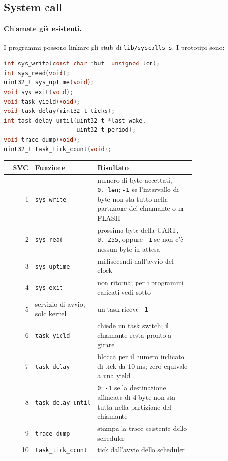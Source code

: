 \subsection{System call}

\begin{sloppypar}
\paragraph{Chiamate già esistenti.} I programmi possono linkare gli stub di \texttt{lib/syscalls.s}. I prototipi sono:
\end{sloppypar}
\begin{lstlisting}[language=C]
int sys_write(const char *buf, unsigned len);
int sys_read(void);
uint32_t sys_uptime(void);
void sys_exit(void);
void task_yield(void);
void task_delay(uint32_t ticks);
int task_delay_until(uint32_t *last_wake,
                     uint32_t period);
void trace_dump(void);
uint32_t task_tick_count(void);
\end{lstlisting}

\begin{center}
\small
\begin{tabular}{|r|p{0.25\linewidth}|p{0.52\linewidth}|}
\hline
SVC & \raggedright Funzione & \raggedright Risultato \tabularnewline
\hline\hline
1 & \raggedright \texttt{sys\_write} & \raggedright numero di byte accettati, \texttt{0..len}; \texttt{-1} se l'intervallo di byte non sta tutto nella partizione del chiamante o in FLASH \tabularnewline
\hline
2 & \raggedright \texttt{sys\_read} & \raggedright prossimo byte della UART, \texttt{0..255}, oppure \texttt{-1} se non c'è nessun byte in attesa \tabularnewline
\hline
3 & \raggedright \texttt{sys\_uptime} & \raggedright millisecondi dall'avvio del clock \tabularnewline
\hline
4 & \raggedright \texttt{sys\_exit} & \raggedright non ritorna; per i programmi caricati vedi sotto \tabularnewline
\hline
5 & \raggedright servizio di avvio, solo kernel & \raggedright un task riceve \texttt{-1} \tabularnewline
\hline
6 & \raggedright \texttt{task\_yield} & \raggedright chiede un task switch; il chiamante resta pronto a girare \tabularnewline
\hline
7 & \raggedright \texttt{task\_delay} & \raggedright blocca per il numero indicato di tick da 10 ms; zero equivale a una yield \tabularnewline
\hline
8 & \raggedright \texttt{task\_delay\_until} & \raggedright \texttt{0}; \texttt{-1} se la destinazione allineata di 4 byte non sta tutta nella partizione del chiamante \tabularnewline
\hline
9 & \raggedright \texttt{trace\_dump} & \raggedright stampa la trace esistente dello scheduler \tabularnewline
\hline
10 & \raggedright \texttt{task\_tick\_count} & \raggedright tick dall'avvio dello scheduler \tabularnewline
\hline
\end{tabular}
\end{center}

